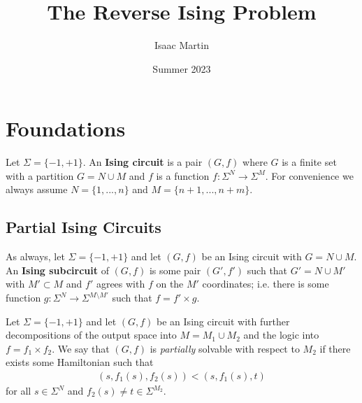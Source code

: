 \documentclass{amsart}
\begin{document}
\newpage
\title{The Reverse Ising Problem}
\author{Isaac Martin}
\date{Summer 2023}
\maketitle
\section{Foundations}
\begin{defn}
  Let $\Sigma = \{-1, +1\}$. An \textbf{Ising circuit} is a pair $(G,f)$ where $G$ is a finite set with a partition $G = N\cup M$ and $f$ is a function $f:\Sigma^N \to \Sigma^M$. For convenience we always assume $N = \{1,...,n\}$ and $M = \{n+1, ..., n+m\}$.
\end{defn}

\subsection{Partial Ising Circuits}

\begin{defn}\label{defn:ising-subcircuit}
  As always, let $\Sigma = \{-1,+1\}$ and let $(G,f)$ be an Ising circuit with $G = N \cup M$. An \textbf{Ising subcircuit} of $(G,f)$ is some pair $(G', f')$ such that $G' = N\cup M'$ with $M' \subset M$ and $f'$ agrees with $f$ on the $M'$ coordinates; i.e. there is some function $g:\Sigma^N \to \Sigma^{M \setminus M'}$ such that $f = f'\times g$.
\end{defn}

\begin{defn}\label{defn:partial-ising}
  Let $\Sigma = \{-1, +1\}$ and let $(G,f)$ be an Ising circuit with further decompositions of the output space into $M = M_1 \cup M_2$ and the logic into $f = f_1\times f_2$. We say that $(G,f)$ is \emph{partially} solvable with respect to $M_2$ if there exists some Hamiltonian such that
  \begin{align*}
    (s,f_1(s),f_2(s)) < (s,f_1(s),t)
  \end{align*}
  for all $s \in \Sigma^N$ and $f_2(s) \neq t \in \Sigma^{M_2}$.
\end{defn}
\end{document}
